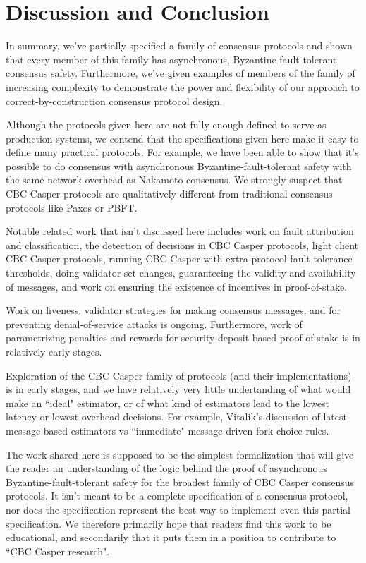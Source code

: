 \section{Discussion and Conclusion}

In summary, we've partially specified a family of consensus protocols and shown that every member of this family has asynchronous, Byzantine-fault-tolerant consensus safety. Furthermore, we've given examples of members of the family of increasing complexity to demonstrate the power and flexibility of our approach to correct-by-construction consensus protocol design.

Although the protocols given here are not fully enough defined to serve as production systems, we contend that the specifications given here make it easy to define many practical protocols. For example, we have been able to show that it's possible to do consensus with asynchronous Byzantine-fault-tolerant safety with the same network overhead as Nakamoto consensus. We strongly suspect that CBC Casper protocols are qualitatively different from traditional consensus protocols like Paxos\cite{paxos} or PBFT\cite{Castro_Liskov_1999_pbft}.

Notable related work that isn't discussed here includes work on fault attribution and classification, the detection of decisions in CBC Casper protocols, light client CBC Casper protocols, running CBC Casper with extra-protocol fault tolerance thresholds, doing validator set changes, guaranteeing the validity and availability of messages, and work on ensuring the existence of incentives in proof-of-stake.

Work on liveness, validator strategies for making consensus messages, and for preventing denial-of-service attacks is ongoing. Furthermore, work of parametrizing penalties and rewards for security-deposit based proof-of-stake is in relatively early stages. 

Exploration of the CBC Casper family of protocols (and their implementations) is in early stages, and we have relatively very little undertanding of what would make an ``ideal" estimator, or of what kind of estimators lead to the lowest latency or lowest overhead decisions. For example, Vitalik's discussion of latest message-based estimators vs ``immediate" message-driven fork choice rules\cite{vitalik-FFG-CBC-wars-tweet-thread}.

The work shared here is supposed to be the simplest formalization that will give the reader an understanding of the logic behind the proof of asynchronous Byzantine-fault-tolerant safety for the broadest family of CBC Casper consensus protocols. It isn't meant to be a complete specification of a consensus protocol, nor does the specification represent the best way to implement even this partial specification. We therefore primarily hope that readers find this work to be educational, and secondarily that it puts them in a position to contribute to ``CBC Casper research".
